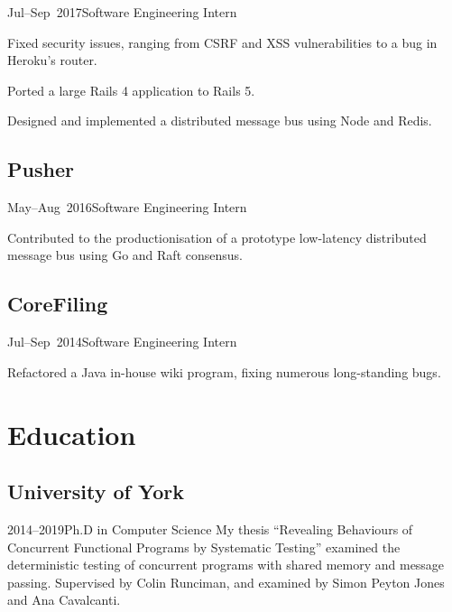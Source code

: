 \documentclass[a4paper]{barrucadu-cv}
\newcommand{\range}[2]{#1–#2}
\begin{document}
\begin{cventry}{\range{Jul}{Sep}~2017}{Software Engineering Intern}
  \begin{tightitemize}
  \item Fixed security issues, ranging from CSRF and XSS vulnerabilities to a bug in Heroku's router.
  \item Ported a large Rails 4 application to Rails 5.
  \item Designed and implemented a distributed message bus using Node and Redis.
  \end{tightitemize}
\end{cventry}

\subsection{Pusher}

\begin{cventry}{\range{May}{Aug}~2016}{Software Engineering Intern}
  \begin{tightitemize}
  \item Contributed to the productionisation of a prototype low-latency distributed message bus using Go and Raft consensus.
  \end{tightitemize}
\end{cventry}

\subsection{CoreFiling}

\begin{cventry}{\range{Jul}{Sep}~2014}{Software Engineering Intern}
  \begin{tightitemize}
  \item Refactored a Java in-house wiki program, fixing numerous long-standing bugs.
  \end{tightitemize}
\end{cventry}

\section{Education}

\subsection{University of York}

\begin{cventry}{\range{2014}{2019}}{Ph.D in Computer Science}
  My thesis ``Revealing Behaviours of Concurrent Functional Programs
  by Systematic Testing'' examined the deterministic testing of
  concurrent programs with shared memory and message passing.
  Supervised by Colin Runciman, and examined by Simon Peyton Jones and
  Ana Cavalcanti.
\end{cventry}
\end{document}
